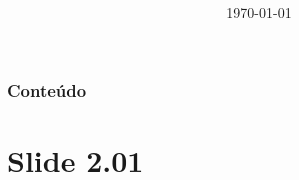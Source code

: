 \documentclass{article}
\title{\huge\bfseries\color{Emph}\mytitle}
\author{\Large\myauthor}
\date{\Large\today}
\begin{document}


\maketitle
\label{Title}



\renewcommand{\contentsname}{} %

\section*{Conteúdo}
\begin{multicols}{2} \tableofcontents \end{multicols}


\restoregeometry

\part{Slide 2.01}
\label{2.01 Slide}
\end{document}
